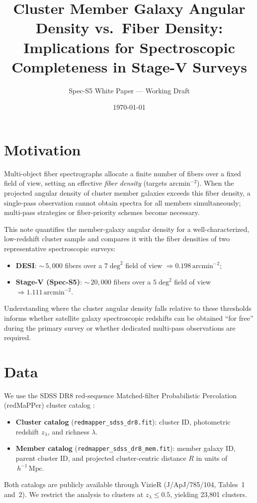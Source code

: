 \documentclass[12pt, letterpaper]{article}
\title{Cluster Member Galaxy Angular Density vs.\ Fiber Density:\\
       Implications for Spectroscopic Completeness in Stage-V Surveys}
\author{Spec-S5 White Paper --- Working Draft}
\date{\today}
\newcommand{\hmpc}{\,h^{-1}\,\mathrm{Mpc}}
\newcommand{\arcminsq}{\,\mathrm{arcmin}^{-2}}
\newcommand{\lam}{\lambda}
\newcommand{\zlam}{z_\lambda}
\begin{document}
\maketitle

\section{Motivation}
\label{sec:motivation}

Multi-object fiber spectrographs allocate a finite number of fibers over
a fixed field of view, setting an effective \emph{fiber density}
(targets\,$\arcminsq$).  When the projected angular density of cluster
member galaxies exceeds this fiber density, a single-pass observation
cannot obtain spectra for all members simultaneously; multi-pass
strategies or fiber-priority schemes become necessary.

This note quantifies the member-galaxy angular density for a
well-characterized, low-redshift cluster sample and compares it with the
fiber densities of two representative spectroscopic surveys:
\begin{itemize}
    \item \textbf{DESI}: ${\sim}\,5{,}000$ fibers over a
          $7\;\mathrm{deg}^2$ field of view
          $\Rightarrow 0.198\arcminsq$;
    \item \textbf{Stage-V (Spec-S5)}: ${\sim}\,20{,}000$ fibers over a
          $5\;\mathrm{deg}^2$ field of view
          $\Rightarrow 1.111\arcminsq$.
\end{itemize}
Understanding where the cluster angular density falls relative to these
thresholds informs whether satellite galaxy spectroscopic redshifts can
be obtained ``for free'' during the primary survey or whether dedicated
multi-pass observations are required.

\section{Data}
\label{sec:data}

We use the SDSS DR8 red-sequence Matched-filter Probabilistic
Percolation (redMaPPer) cluster catalog \citep{Rykoff2014}:
\begin{itemize}
    \item \textbf{Cluster catalog} (\texttt{redmapper\_sdss\_dr8.fit}):
          cluster ID, photometric redshift $\zlam$, and richness $\lam$.
    \item \textbf{Member catalog} (\texttt{redmapper\_sdss\_dr8\_mem.fit}):
          member galaxy ID, parent cluster ID, and projected
          cluster-centric distance $R$ in units of $\hmpc$.
\end{itemize}
Both catalogs are publicly available through VizieR
(J/ApJ/785/104, Tables~1 and~2).
We restrict the analysis to clusters at $\zlam \leq 0.5$, yielding
23{,}801 clusters.
\end{document}
